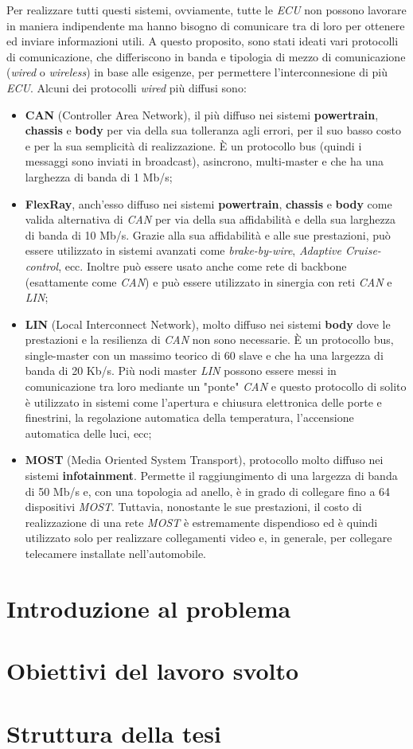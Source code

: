 Per realizzare tutti questi sistemi, ovviamente, tutte le \emph{ECU} non possono lavorare in maniera indipendente ma hanno bisogno di comunicare tra di loro per ottenere ed inviare informazioni utili. A questo proposito, sono stati ideati vari protocolli di comunicazione, che differiscono in banda e tipologia di mezzo di comunicazione (\emph{wired} o \emph{wireless}) in base alle esigenze, per permettere l'interconnesione di più \emph{ECU}. Alcuni dei protocolli \emph{wired} più diffusi sono:
\begin{itemize}
    \item \textbf{CAN} (Controller Area Network), il più diffuso nei sistemi \textbf{powertrain}, \textbf{chassis} e \textbf{body} per via della sua tolleranza agli errori, per il suo basso costo e per la sua semplicità di realizzazione. È un protocollo bus (quindi i messaggi sono inviati in broadcast), asincrono, multi-master e che ha una larghezza di banda di 1 Mb/s;
    \item \textbf{FlexRay}, anch'esso diffuso nei sistemi \textbf{powertrain}, \textbf{chassis} e \textbf{body} come valida alternativa di \emph{CAN} per via della sua affidabilità e della sua larghezza di banda di 10 Mb/s. Grazie alla sua affidabilità e alle sue prestazioni, può essere utilizzato in sistemi avanzati come \emph{brake-by-wire}, \emph{Adaptive Cruise-control}, ecc. Inoltre può essere usato anche come rete di backbone (esattamente come \emph{CAN}) e può essere utilizzato in sinergia con reti \emph{CAN} e \emph{LIN};
    \item \textbf{LIN} (Local Interconnect Network), molto diffuso nei sistemi \textbf{body} dove le prestazioni e la resilienza di \emph{CAN} non sono necessarie. È un protocollo bus, single-master con un massimo teorico di 60 slave e che ha una largezza di banda di 20 Kb/s. Più nodi master \emph{LIN} possono essere messi in comunicazione tra loro mediante un "ponte" \emph{CAN} e questo protocollo di solito è utilizzato in sistemi come l'apertura e chiusura elettronica delle porte e finestrini, la regolazione automatica della temperatura, l'accensione automatica delle luci, ecc; \cite{vinodhkumar_2014_automotive}
    \item \textbf{MOST} (Media Oriented System Transport), protocollo molto diffuso nei sistemi \textbf{infotainment}. Permette il raggiungimento di una largezza di banda di 50 Mb/s e, con una topologia ad anello, è in grado di collegare fino a 64 dispositivi \emph{MOST}. Tuttavia, nonostante le sue prestazioni, il costo di realizzazione di una rete \emph{MOST} è estremamente dispendioso ed è quindi utilizzato solo per realizzare collegamenti video e, in generale, per collegare telecamere installate nell'automobile. \cite{huang_2019_invehicle}
\end{itemize}

\section{Introduzione al problema}

\section{Obiettivi del lavoro svolto} %

\section{Struttura della tesi}
